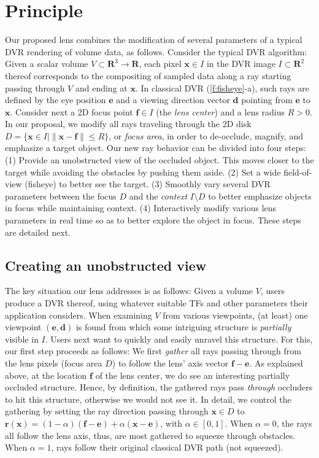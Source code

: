 \section{Principle}
\label{sec:principle}
%
%
Our proposed lens combines the modification of several parameters of a typical DVR rendering of volume data, as follows. Consider the typical DVR algorithm: Given a scalar volume $V \subset \mathbf{R}^3 \rightarrow \mathbf{R}$, each pixel $\mathbf{x} \in I$ in the DVR image $I \subset \mathbf{R}^2$ thereof corresponds to the compositing of sampled data along a ray starting passing through $V$ and ending at $\mathbf{x}$. In classical DVR (\autoref{f:fisheye}-a), such rays are defined by the eye position $\mathbf{e}$ and a viewing direction vector $\mathbf{d}$ pointing from $\mathbf{e}$ to $\mathbf{x}$. Consider next a 2D focus point $\mathbf{f} \in I$ (the \emph{lens center}) and a lens radius $R > 0$. In our proposal, we modify all rays traveling through the 2D disk $D = \{\mathbf{x} \in I | \| \mathbf{x} - \mathbf{f} \| \leq R\}$, or \emph{focus area}, in order to de-occlude, magnify, and emphasize a target object. Our new ray behavior can be divided into four steps: (1) Provide an unobstructed view of the occluded object. This moves closer to the target while avoiding the obstacles by pushing them aside. (2) Set a wide field-of-view (fisheye) to better see the target. (3) Smoothly vary several DVR parameters between the focus $D$ and the \emph{context} $I \setminus D$ to better emphasize objects in focus while maintaining context. (4) Interactively modify various lens parameters in real time so as to better explore the object in focus. These steps are detailed next.

\subsection{Creating an unobstructed view}
\label{sec:gathering}
%
The key situation our lens addresses is as follows: Given a volume $V$, users produce a DVR thereof, using whatever suitable TFs and other parameters their application considers. When examining $V$ from various viewpoints, (at least) one viewpoint $(\mathbf{e},\mathbf{d})$ is found from which some intriguing structure is \emph{partially} visible in $I$. Users next want to quickly and easily unravel this structure. For this, our first step proceeds as follows: We first \emph{gather} all rays passing through from the lens pixels (focus area $D$) to follow the lens' axis vector $\mathbf{f} - \mathbf{e}$. As explained above, at the location $\mathbf{f}$ of the lens center, we do see an interesting partially occluded structure. Hence, by definition, the gathered rays pass \emph{through} occluders to hit this structure, otherwise we would not see it. In detail, we control the gathering by setting the ray direction passing through $\mathbf{x} \in D$ to $\mathbf{r}(\mathbf{x}) = (1-\alpha)(\mathbf{f} - \mathbf{e}) + \alpha (\mathbf{x} - \mathbf{e})$, with $\alpha \in [0,1]$. When $\alpha=0$, the rays all follow the lens axis, thus, are most gathered to squeeze through obstacles. When $\alpha=1$, rays follow their original classical DVR path (not squeezed).
